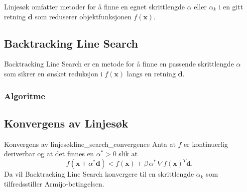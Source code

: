 Linjesøk omfatter metoder for å finne en egnet skrittlengde \(\alpha\) eller \(\alpha_k\) i en gitt retning \(\symbf{d}\) som reduserer objektfunksjonen \(f(\symbf{x})\).

\subsection{Backtracking Line Search}
Backtracking Line Search er en metode for å finne en passende skrittlengde \(\alpha\) som sikrer en ønsket reduksjon i \(f(\symbf{x})\) langs en retning \(\symbf{d}\).

\subsubsection{Algoritme}
\begin{algorithm}[H]
	\SetAlgoLined
	\caption{Backtracking Line Search (BLS)}
	\label{alg:backtracking_line_search}
\end{algorithm}

\subsection{Konvergens av Linjesøk}
\begin{theorem}{Konvergens av linjesøk}{line_search_convergence}
	Anta at \(f\) er kontinuerlig deriverbar og at det finnes en \(\alpha^\ast > 0\) slik at
	\[
		f(\symbf{x} + \alpha^\ast \symbf{d}) < f(\symbf{x}) + \beta\,\alpha^\ast\,\nabla f(\symbf{x})^T \symbf{d}.
	\]
	Da vil Backtracking Line Search konvergere til en skrittlengde \(\alpha_k\) som tilfredsstiller Armijo-betingelsen.
\end{theorem}

